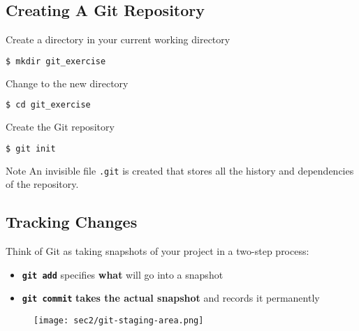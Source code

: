 \subsection{Creating A Git Repository}\hypertarget{sec2.2}{}


\begin{frame}[fragile]
\emptyframetitle

  Create a directory in your current working directory
  \begin{lstlisting}[language=bash]
    $ mkdir git_exercise
  \end{lstlisting}

  Change to the new directory
  \begin{lstlisting}[language=bash]
    $ cd git_exercise
  \end{lstlisting}

  Create the Git repository
  \begin{lstlisting}[language=bash]
    $ git init
  \end{lstlisting}

  \begin{block}{Note}
An invisible file \texttt{.git} is created that stores all the history and dependencies of the repository.
  \end{block}

\end{frame}

\subsection{Tracking Changes}\hypertarget{sec2.3}{}

\begin{frame}[fragile]
\emptyframetitle

  Think of Git as taking snapshots of your project in a two-step process:
  \begin{itemize}
    \item \texttt{\textbf{git add}} specifies \textbf{what} will go into a snapshot
    \item \texttt{\textbf{git commit}} \textbf{takes the actual snapshot} and records it permanently
  \end{itemize}

  \begin{figure}[h]
    \texttt{[image: sec2/git-staging-area.png]}
  \end{figure}

\end{frame}

